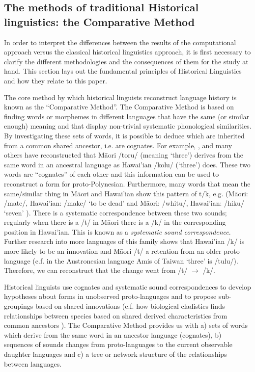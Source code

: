 \documentclass[a4paper,10pt]{article} %
\begin{document}
\subsection{The methods of traditional Historical linguistics: the Comparative Method}
\label{sec:ars:metod:hist}
In order to interpret the differences between the results of the computational approach versus the classical historical linguistics approach, it is first necessary to clarify the different methodologies and the consequences of them for the study at hand. This section lays out the fundamental principles of Historical Linguistics and how they relate to this paper.

The core method by which historical linguists reconstruct language history is known as the ``Comparative Method''. The Comparative Method is based on finding words or morphemes in different languages that have the same (or similar enough) meaning and that display non-trivial systematic phonological similarities. By investigating these sets of words, it is possible to deduce which are inherited from a common shared ancestor, i.e. are cognates. For example, \citet{blust2004}, \citet{greenhill2011pollex} and many others have reconstructed that M\={a}ori /toru/ (meaning `three') derives from the same word in an ancestral language as Hawai'ian /kolu/ (`three') does. These two words are ``cognates'' of each other and this information can be used to reconstruct a form for proto-Polynesian. Furthermore, many words that mean the same/similar thing in M\={a}ori and Hawai'ian show this pattern of t/k, e.g. (M\={a}ori: /mate/, Hawai'ian: /make/ `to be dead'  and M\={a}ori: /whitu/, Hawai'ian: /hiku/ `seven' \citep{ABVD}). There is a systematic correspondence between these two sounds; regularly when there is a /t/ in M\={a}ori there is a /k/ in the corresponding position in Hawai'ian. This is known as a \emph{systematic sound correspondence}. Further research into more languages of this family shows that Hawai'ian /k/ is more likely to be an innovation and M\={a}ori /t/ a retention from an older proto-language (c.f. in the Austronesian language Amis of Taiwan `three' is /tulu/). Therefore, we can reconstruct that the change went from /t/ $\rightarrow$ /k/.


Historical linguists use cognates and systematic sound correspondences to develop hypotheses about forms in unobserved proto-languages and to propose sub-groupings based on shared innovations (c.f. how biological cladistics finds relationships between species based on shared derived characteristics from common ancestors \citep[16-17]{maclaurin2008biodiversity}). The Comparative Method provides us with a) sets of words which derive from the same word in an ancestor language (cognates), b) sequences of sounds changes from proto-languages to the current observable daughter languages and c) a tree or network structure of the relationships between languages. 
 
\end{document}
